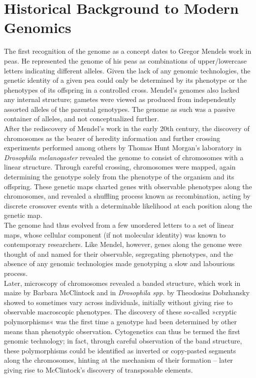 \section*{Historical Background to Modern Genomics}

The first recognition of the genome as a concept dates to Gregor Mendels work in peas\cite{mendel66, portin17}.
He represented the genome of his peas as combinations of upper/lowercase letters indicating different alleles.
Given the lack of any genomic technologies, the genetic identity of a given pea could only be determined by its phenotype or the phenotypes of its offspring in a controlled cross.
Mendel's genomes also lacked any internal structure; gametes were viewed as produced from independently assorted alleles of the parental genotypes.
The genome as such was a passive container of alleles, and not conceptualized further.\\
After the rediscovery of Mendel's work in the early 20th century, the discovery of chromosomes as the bearer of heredity information and further crossing experiments performed among others by Thomas Hunt Morgan's laboratory in \textit{Drosophila melanogaster} revealed the genome to consist of chromosomes with a linear structure\cite{sturtevant13, portin17}.
Through careful crossing, chromosomes were mapped, again determining the genotype solely from the phenotype of the organism and its offspring.
These genetic maps charted genes with observable phenotypes along the chromosomes, and revealed a shuffling process known as recombination, acting by discrete crossover events with a determinable likelihood at each position along the genetic map.\\
The genome had thus evolved from a few unordered letters to a set of linear maps, whose cellular component (if not molecular identity) was known to contemporary researchers.
Like Mendel, however, genes along the genome were thought of and named for their observable, segregating phenotypes, and the absence of any genomic technologies made genotyping a slow and labourious process.\\
Later, microscopy of chromosomes revealed a banded structure, which work in maize by Barbara McClintock and in \textit{Drosophila spp.} by Theodosius Dobzhansky showed to sometimes vary across individuals, initially without giving rise to observable macroscopic phenotypes\cite{dobzhansky29}.
The discovery of these so-called »cryptic polymorphisms« was the first time a genotype had been determined by other means than phenotypic observation.
Cytogenetics can thus be termed the first genomic technology; in fact, through careful observation of the band structure, these polymorphisms could be identified as inverted or copy-pasted segments along the chromosomes, hinting at the mechanism of their formation -- later giving rise to McClintock's discovery of transposable elements\cite{mcclintock50}.\\
